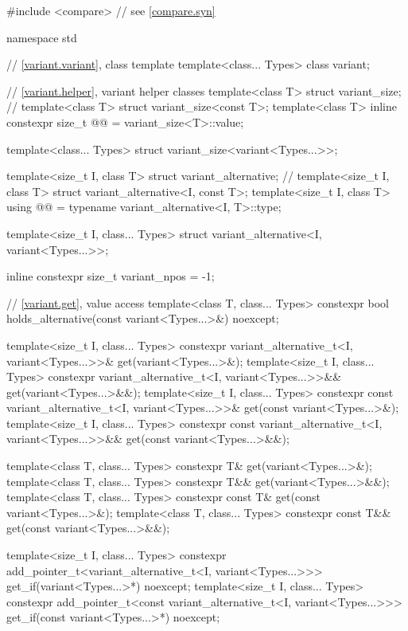 \begin{codeblock}
#include <compare>              // see \ref{compare.syn}

namespace std {
  // \ref{variant.variant}, class template 
  template<class... Types>
    class variant;

  // \ref{variant.helper}, variant helper classes
  template<class T> struct variant_size;                        // \notdef
  template<class T> struct variant_size<const T>;
  template<class T>
    inline constexpr size_t @@ = variant_size<T>::value;

  template<class... Types>
    struct variant_size<variant<Types...>>;

  template<size_t I, class T> struct variant_alternative;       // \notdef
  template<size_t I, class T> struct variant_alternative<I, const T>;
  template<size_t I, class T>
    using @@ = typename variant_alternative<I, T>::type;

  template<size_t I, class... Types>
    struct variant_alternative<I, variant<Types...>>;

  inline constexpr size_t variant_npos = -1;

  // \ref{variant.get}, value access
  template<class T, class... Types>
    constexpr bool holds_alternative(const variant<Types...>&) noexcept;

  template<size_t I, class... Types>
    constexpr variant_alternative_t<I, variant<Types...>>& get(variant<Types...>&);
  template<size_t I, class... Types>
    constexpr variant_alternative_t<I, variant<Types...>>&& get(variant<Types...>&&);
  template<size_t I, class... Types>
    constexpr const variant_alternative_t<I, variant<Types...>>& get(const variant<Types...>&);
  template<size_t I, class... Types>
    constexpr const variant_alternative_t<I, variant<Types...>>&& get(const variant<Types...>&&);

  template<class T, class... Types>
    constexpr T& get(variant<Types...>&);
  template<class T, class... Types>
    constexpr T&& get(variant<Types...>&&);
  template<class T, class... Types>
    constexpr const T& get(const variant<Types...>&);
  template<class T, class... Types>
    constexpr const T&& get(const variant<Types...>&&);

  template<size_t I, class... Types>
    constexpr add_pointer_t<variant_alternative_t<I, variant<Types...>>>
      get_if(variant<Types...>*) noexcept;
  template<size_t I, class... Types>
    constexpr add_pointer_t<const variant_alternative_t<I, variant<Types...>>>
      get_if(const variant<Types...>*) noexcept;

}
\end{codeblock}
